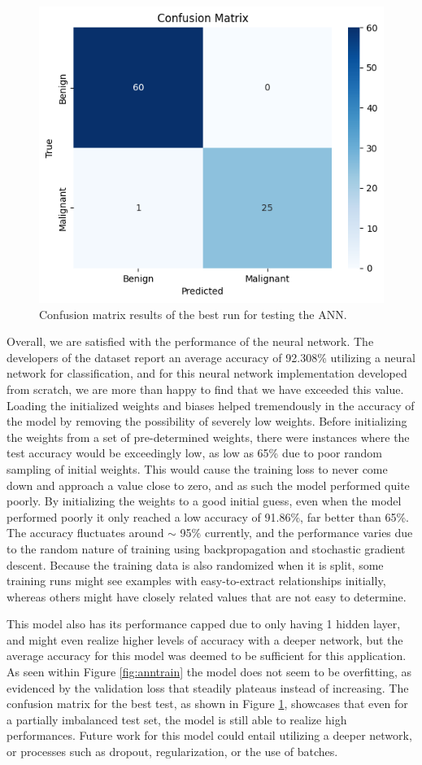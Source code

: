 \documentclass[a4paper]{article}
\begin{document}
\begin{figure}[h!]
    \centering
    \includegraphics[width=0.8\linewidth]{images/ANNcm.png}
    \caption{Confusion matrix results of the best run for testing the ANN.}
    \label{fig:anncm}
\end{figure}
\newpage

Overall, we are satisfied with the performance of the neural network. The developers of the dataset report an average accuracy of 92.308\% utilizing a neural network for classification, and for this neural network implementation developed from scratch, we are more than happy to find that we have exceeded this value. Loading the initialized weights and biases helped tremendously in the accuracy of the model by removing the possibility of severely low weights. Before initializing the weights from a set of pre-determined weights, there were instances where the test accuracy would be exceedingly low, as low as 65\% due to poor random sampling of initial weights. This would cause the training loss to never come down and approach a value close to zero, and as such the model performed quite poorly. By initializing the weights to a good initial guess, even when the model performed poorly it only reached a low accuracy of 91.86\%, far better than 65\%. The accuracy fluctuates around $\sim$ 95\% currently, and the performance varies due to the random nature of training using backpropagation and stochastic gradient descent. Because the training data is also randomized when it is split, some training runs might see examples with easy-to-extract relationships initially, whereas others might have closely related values that are not easy to determine.

This model also has its performance capped due to only having 1 hidden layer, and might even realize higher levels of accuracy with a deeper network, but the average accuracy for this model was deemed to be sufficient for this application. As seen within Figure \ref{fig:anntrain} the model does not seem to be overfitting, as evidenced by the validation loss that steadily plateaus instead of increasing. The confusion matrix for the best test, as shown in Figure \ref{fig:anncm}, showcases that even for a partially imbalanced test set, the model is still able to realize high performances. Future work for this model could entail utilizing a deeper network, or processes such as dropout, regularization, or the use of batches.
\end{document}
